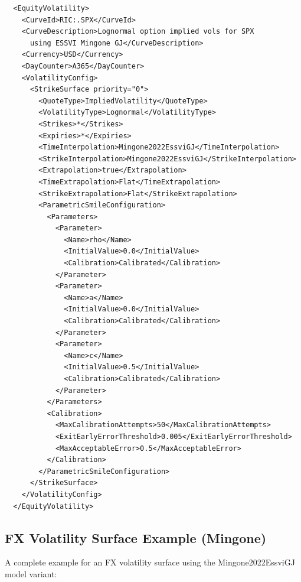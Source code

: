 \documentclass{amsart}
\theoremstyle{plain}
\numberwithin{equation}{section}
\begin{document}
\begin{verbatim}
  <EquityVolatility>
    <CurveId>RIC:.SPX</CurveId>
    <CurveDescription>Lognormal option implied vols for SPX
      using ESSVI Mingone GJ</CurveDescription>
    <Currency>USD</Currency>
    <DayCounter>A365</DayCounter>
    <VolatilityConfig>
      <StrikeSurface priority="0">
        <QuoteType>ImpliedVolatility</QuoteType>
        <VolatilityType>Lognormal</VolatilityType>
        <Strikes>*</Strikes>
        <Expiries>*</Expiries>
        <TimeInterpolation>Mingone2022EssviGJ</TimeInterpolation>
        <StrikeInterpolation>Mingone2022EssviGJ</StrikeInterpolation>
        <Extrapolation>true</Extrapolation>
        <TimeExtrapolation>Flat</TimeExtrapolation>
        <StrikeExtrapolation>Flat</StrikeExtrapolation>
        <ParametricSmileConfiguration>
          <Parameters>
            <Parameter>
              <Name>rho</Name>
              <InitialValue>0.0</InitialValue>
              <Calibration>Calibrated</Calibration>
            </Parameter>
            <Parameter>
              <Name>a</Name>
              <InitialValue>0.0</InitialValue>
              <Calibration>Calibrated</Calibration>
            </Parameter>
            <Parameter>
              <Name>c</Name>
              <InitialValue>0.5</InitialValue>
              <Calibration>Calibrated</Calibration>
            </Parameter>
          </Parameters>
          <Calibration>
            <MaxCalibrationAttempts>50</MaxCalibrationAttempts>
            <ExitEarlyErrorThreshold>0.005</ExitEarlyErrorThreshold>
            <MaxAcceptableError>0.5</MaxAcceptableError>
          </Calibration>
        </ParametricSmileConfiguration>
      </StrikeSurface>
    </VolatilityConfig>
  </EquityVolatility>
\end{verbatim}



\subsection{FX Volatility Surface Example (Mingone)}

A complete example for an FX volatility surface using the Mingone2022EssviGJ model variant:
\end{document}
